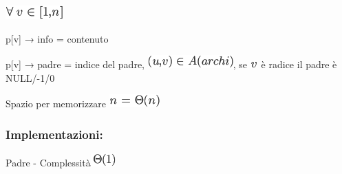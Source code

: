 \documentclass{article}
\begin{document}
{}

\includegraphics{images/image104.png}

{p{[}v{]} → info = contenuto}

{p{[}v{]} → padre = indice del padre,
}\includegraphics{images/image105.png}{, se
}\includegraphics{images/image76.png}{~è radice il padre è NULL/-1/0}

{}

{Spazio per memorizzare }\includegraphics{images/image106.png}

{}

\hypertarget{h.ncrwkhkrovb2}{\subsubsection{\texorpdfstring{{Implementazioni:}}{Implementazioni:}}\label{h.ncrwkhkrovb2}}

{Padre - }{Complessità}\includegraphics{images/image107.png}

\protect\hypertarget{t.13d3d44b5647536d159823e4ed75c88728308b7e}{}{}\protect\hypertarget{t.5}{}{}
\end{document}
